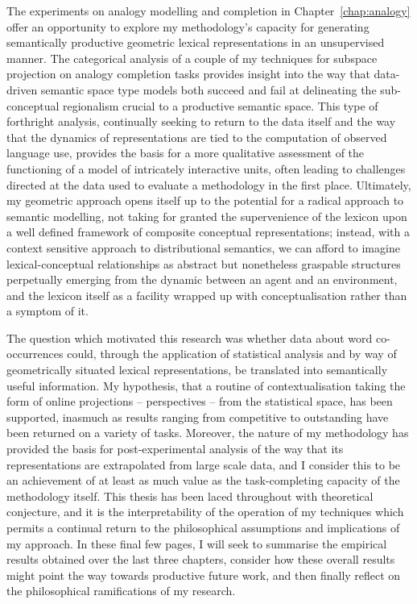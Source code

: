 The experiments on analogy modelling and completion in Chapter~\ref{chap:analogy} offer an opportunity to explore my methodology's capacity for generating semantically productive geometric lexical representations in an unsupervised manner.  The categorical analysis of a couple of my techniques for subspace projection on analogy completion tasks provides insight into the way that data-driven semantic space type models both succeed and fail at delineating the sub-conceptual regionalism crucial to a productive semantic space.  This type of forthright analysis, continually seeking to return to the data itself and the way that the dynamics of representations are tied to the computation of observed language use, provides the basis for a more qualitative assessment of the functioning of a model of intricately interactive units, often leading to challenges directed at the data used to evaluate a methodology in the first place.  Ultimately, my geometric approach opens itself up to the potential for a radical approach to semantic modelling, not taking for granted the supervenience of the lexicon upon a well defined framework of composite conceptual representations; instead, with a context sensitive approach to distributional semantics, we can afford to imagine lexical-conceptual relationships as abstract but nonetheless graspable structures perpetually emerging from the dynamic between an agent and an environment, and the lexicon itself as a facility wrapped up with conceptualisation rather than a symptom of it.

The question which motivated this research was whether data about word co-occurrences could, through the application of statistical analysis and by way of geometrically situated lexical representations, be translated into semantically useful information.  My hypothesis, that a routine of contextualisation taking the form of online projections -- perspectives -- from the statistical space, has been supported, inasmuch as results ranging from competitive to outstanding have been returned on a variety of tasks.  Moreover, the nature of my methodology has provided the basis for post-experimental analysis of the way that its representations are extrapolated from large scale data, and I consider this to be an achievement of at least as much value as the task-completing capacity of the methodology itself.  This thesis has been laced throughout with theoretical conjecture, and it is the interpretability of the operation of my techniques which permits a continual return to the philosophical assumptions and implications of my approach.  In these final few pages, I will seek to summarise the empirical results obtained over the last three chapters, consider how these overall results might point the way towards productive future work, and then finally reflect on the philosophical ramifications of my research.

